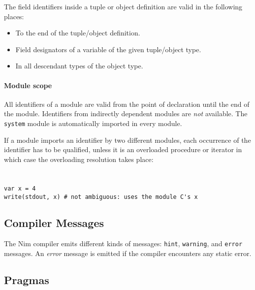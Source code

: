 The field identifiers inside a tuple or object definition are valid in
the following places:

\begin{itemize}
\tightlist
\item
  To the end of the tuple/object definition.
\item
  Field designators of a variable of the given tuple/object type.
\item
  In all descendant types of the object type.
\end{itemize}

\hypertarget{module-scope}{%
\paragraph{Module scope}\label{module-scope}}

All identifiers of a module are valid from the point of declaration
until the end of the module. Identifiers from indirectly dependent
modules are \emph{not} available. The \texttt{system} module is
automatically imported in every module.

If a module imports an identifier by two different modules, each
occurrence of the identifier has to be qualified, unless it is an
overloaded procedure or iterator in which case the overloading
resolution takes place:

\begin{verbatim}
\end{verbatim}

\begin{verbatim}
\end{verbatim}

\begin{verbatim}
var x = 4
write(stdout, x) # not ambiguous: uses the module C's x
\end{verbatim}

\hypertarget{compiler-messages}{%
\subsection{Compiler Messages}\label{compiler-messages}}

The Nim compiler emits different kinds of messages: \texttt{hint},
\texttt{warning}, and \texttt{error} messages. An \emph{error} message
is emitted if the compiler encounters any static error.

\hypertarget{pragmas}{%
\subsection{Pragmas}\label{pragmas}}

